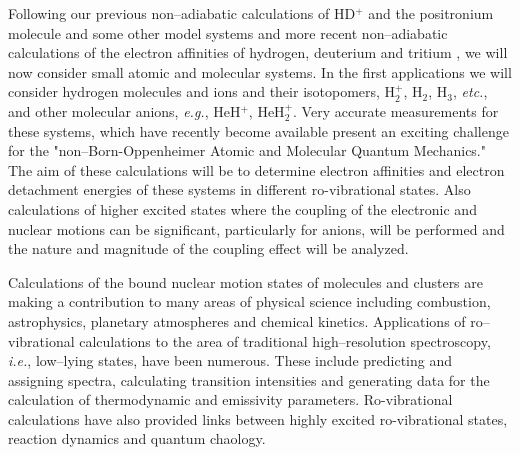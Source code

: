 Following our previous non--adiabatic calculations of HD$^+$
and the positronium molecule and some other model systems
\cite{A3,A6,A16,A27,kozlowski91,%
kozlowski92b,kozlowski92c} and more 
recent non--adiabatic calculations
of the electron affinities of hydrogen, deuterium and tritium
\cite{A37},
we will now consider small atomic and molecular systems.
In the first applications 
we will consider
hydrogen molecules and ions and their isotopomers,
H$_2^+$, H$_2$, H$_3$, {\it etc.}, 
and other molecular anions, {\it e.g.}, HeH$^+$, HeH$_2^+$.
Very accurate measurements for these systems, which have recently become
available present an exciting challenge for 
the "non--Born-Oppenheimer Atomic and Molecular Quantum Mechanics."
The aim of these calculations will be to determine 
electron affinities and electron detachment energies 
of these systems in different ro-vibrational states.
Also calculations of 
higher excited states
where the coupling of the electronic and nuclear motions
can be significant, particularly for anions,
will be performed and the nature and magnitude of the 
coupling effect will be 
analyzed.

Calculations of the bound nuclear motion states of molecules and
clusters are making a contribution to many areas of physical science
including combustion, astrophysics, planetary atmospheres and
chemical kinetics. Applications of ro--vibrational calculations
to the area of traditional high--resolution spectroscopy, {\it i.e.},
low--lying states, have been numerous. These include predicting and
assigning spectra, calculating transition intensities and 
generating data for the calculation of thermodynamic and emissivity
parameters. Ro-vibrational calculations have also provided links
between highly excited ro-vibrational states, reaction dynamics and
quantum chaology.

